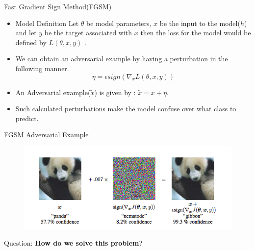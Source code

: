 \documentclass[10pt]{beamer}
\begin{document}
\begin{frame}{Fast Gradient Sign Method(FGSM)}
\begin{itemize}
	
	\item[] { \begin{block}{Model Definition}
		Let $\theta$ be model parameters, $x$ be the input to the model($h$) and let $y$ be the target associated with $x$ then the loss for the model would be defined by $L(\theta,x,y)$ .
	\end{block} }
	\pause
	\item[] {We can obtain an adversarial example by having a perturbation in the following manner.  \\
				\begin{equation}
					\eta = \epsilon sign(\nabla_{x} L(\theta, x,y)) 
				\end{equation} 
			
		}
	\pause
	\item[] An Adversarial example($\tilde{x}$) is given by : $\tilde{x} = x + \eta$.  
	\pause
	\item[] Such calculated perturbations make the model confuse over what class to predict.

\end{itemize}

\end{frame}


\begin{frame}{FGSM Adversarial Example}
	\begin{figure}
	\includegraphics[width=\textwidth]{panda-break}
\end{figure}
\pause
\begin{alertblock}{Question:}
	\textbf{\alert{How do we solve this problem?}}
\end{alertblock}
\end{frame}
\end{document}
